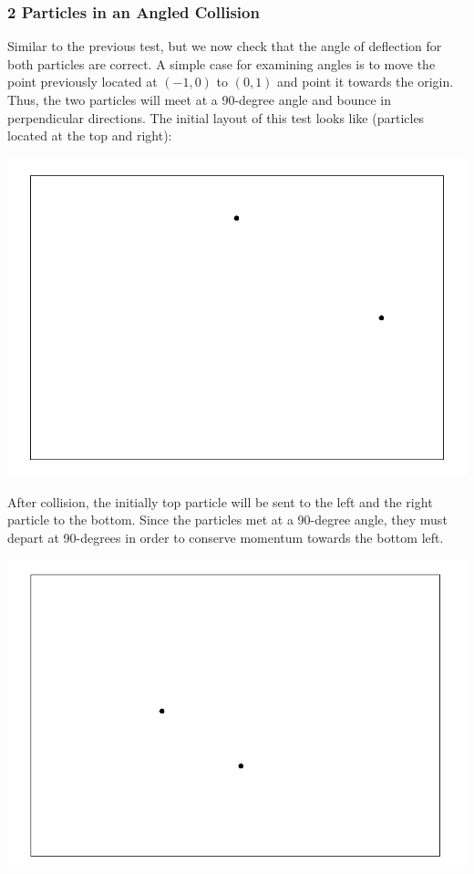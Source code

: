\documentclass{article}
\begin{document}
\subsubsection{2 Particles in an Angled Collision}
Similar to the previous test, but we now check that the angle of deflection for both particles are correct.
A simple case for examining angles is to move the point previously located at $(-1,0)$ to $(0,1)$ and point it towards the origin.
Thus, the two particles will meet at a 90-degree angle and bounce in perpendicular directions.
The initial layout of this test looks like (particles located at the top and right):
\\
\begin{center}
    \includegraphics[scale=0.5]{uncharged_2_2D_start}
\end{center}

After collision, the initially top particle will be sent to the left and the right particle to the bottom.
Since the particles met at a 90-degree angle, they must depart at 90-degrees in order to conserve momentum
towards the bottom left.
\\
\begin{center}
    \includegraphics[scale=0.5]{uncharged_2_2D_after}
\end{center}
\end{document}
